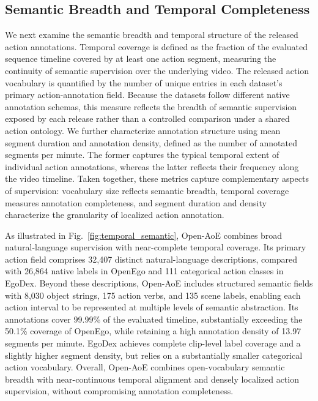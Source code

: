 \subsection{Semantic Breadth and Temporal Completeness}

We next examine the semantic breadth and temporal structure of the released action annotations. %
Temporal coverage is defined as the fraction of the evaluated sequence timeline covered by at least one action segment, measuring the continuity of semantic supervision over the underlying video. %
The released action vocabulary is quantified by the number of unique entries in each dataset's primary action-annotation field. %
Because the datasets follow different native annotation schemas, this measure reflects the breadth of semantic supervision exposed by each release rather than a controlled comparison under a shared action ontology. %
We further characterize annotation structure using mean segment duration and annotation density, defined as the number of annotated segments per minute. %
The former captures the typical temporal extent of individual action annotations, whereas the latter reflects their frequency along the video timeline. %
Taken together, these metrics capture complementary aspects of supervision: vocabulary size reflects semantic breadth, temporal coverage measures annotation completeness, and segment duration and density characterize the granularity of localized action annotation.

As illustrated in Fig.~\ref{fig:temporal_semantic}, Open-AoE combines broad natural-language supervision with near-complete temporal coverage. %
Its primary action field comprises 32,407 distinct natural-language descriptions, compared with 26,864 native labels in OpenEgo and 111 categorical action classes in EgoDex. %
Beyond these descriptions, Open-AoE includes structured semantic fields with 8,030 object strings, 175 action verbs, and 135 scene labels, enabling each action interval to be represented at multiple levels of semantic abstraction. %
Its annotations cover 99.99\% of the evaluated timeline, substantially exceeding the 50.1\% coverage of OpenEgo, while retaining a high annotation density of 13.97 segments per minute. %
EgoDex achieves complete clip-level label coverage and a slightly higher segment density, but relies on a substantially smaller categorical action vocabulary. %
Overall, Open-AoE combines open-vocabulary semantic breadth with near-continuous temporal alignment and densely localized action supervision, without compromising annotation completeness.


